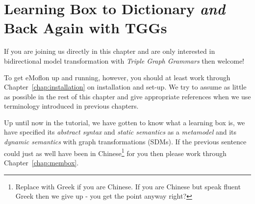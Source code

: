 \chapter{Learning Box to Dictionary \emph{and} Back Again with TGGs}
\label{chap:Learning-Box-to-Dictionary-and-Back-Again}

If you are joining us directly in this chapter and are only interested in bidirectional model transformation with \emph{Triple Graph Grammars} then welcome!

To get eMoflon up and running, however, you should at least work through Chapter~\ref{chap:installation} on installation and set-up.
We try to assume as little as possible in the rest of this chapter and give appropriate references when we use terminology introduced in previous chapters.

Up until now in the tutorial, we have gotten to know what a learning box is, we have specified its \emph{abstract syntax} and \emph{static semantics} as a \emph{metamodel} and its \emph{dynamic semantics} with graph transformations (SDMs).
If the previous sentence could just as well have been in Chinese\footnote{Replace with Greek if you are Chinese.  If you are Chinese but speak fluent Greek then we give up - you get the point anyway right?} for you then please work through Chapter~\ref{chap:membox}.

